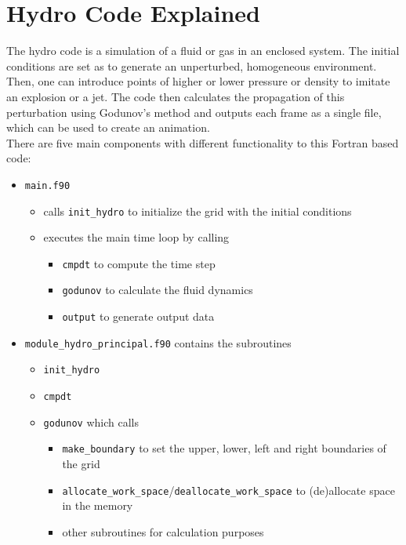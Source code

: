 \documentclass[12pt, a4paper, titlepage]{article}
\begin{document}
\newpage
\clearpage
\thispagestyle{plain}
\setcounter{page}{1}
{\pagestyle{plain}
\tableofcontents\label{toc}
\clearpage
{}
\setcounter{page}{1}




\newpage
\section{Hydro Code Explained}

The hydro code is a simulation of a fluid or gas in an enclosed system. The initial conditions are set as to generate an unperturbed, homogeneous environment. Then, one can introduce points of higher or lower pressure or density to imitate an explosion or a jet. The code then calculates the propagation of this perturbation using Godunov's method and outputs each frame as a single file, which can be used to create an animation.\\

There are five main components with different functionality to this Fortran based code:
\begin{itemize}
	\item \texttt{main.f90}
	\begin{itemize}
		\item calls \texttt{init\_hydro} to initialize the grid with the initial conditions
		\item executes the main time loop by calling
		\begin{itemize}
		\item \texttt{cmpdt} to compute the time step
		\item \texttt{godunov} to calculate the fluid dynamics
		\item \texttt{output} to generate output data
		\end{itemize}
	\end{itemize}
	\item \texttt{module\_hydro\_principal.f90} contains the subroutines
	\begin{itemize}
		\item \texttt{init\_hydro}
		\item \texttt{cmpdt}
		\item \texttt{godunov} which calls
		\begin{itemize}
				\item \texttt{make\_boundary} to set the upper, lower, left and right boundaries of the grid
				\item \texttt{allocate\_work\_space}/\texttt{deallocate\_work\_space} to (de)allocate space in the memory
				\item other subroutines for calculation purposes
			

\end{itemize}
\end{itemize}
\end{itemize}}
\end{document}
